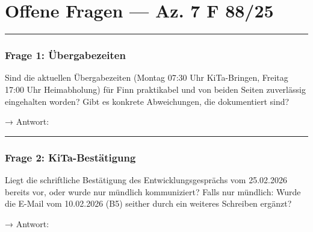 \documentclass[
  11pt,
  a4paper,
]{article}
\begin{document}

\section{Offene Fragen --- Az. 7 F
88/25}\label{offene-fragen-az.-7-f-8825}

\begin{center}\rule{0.5\linewidth}{0.5pt}\end{center}

\subsubsection{Frage 1: Übergabezeiten}\label{frage-1-uxfcbergabezeiten}

Sind die aktuellen Übergabezeiten (Montag 07:30 Uhr KiTa-Bringen,
Freitag 17:00 Uhr Heimabholung) für Finn praktikabel und von beiden
Seiten zuverlässig eingehalten worden? Gibt es konkrete Abweichungen,
die dokumentiert sind?

→ Antwort:

\begin{center}\rule{0.5\linewidth}{0.5pt}\end{center}

\subsubsection{Frage 2:
KiTa-Bestätigung}\label{frage-2-kita-bestuxe4tigung}

Liegt die schriftliche Bestätigung des Entwicklungsgesprächs vom
25.02.2026 bereits vor, oder wurde nur mündlich kommuniziert? Falls nur
mündlich: Wurde die E-Mail vom 10.02.2026 (B5) seither durch ein
weiteres Schreiben ergänzt?

→ Antwort:
\end{document}
